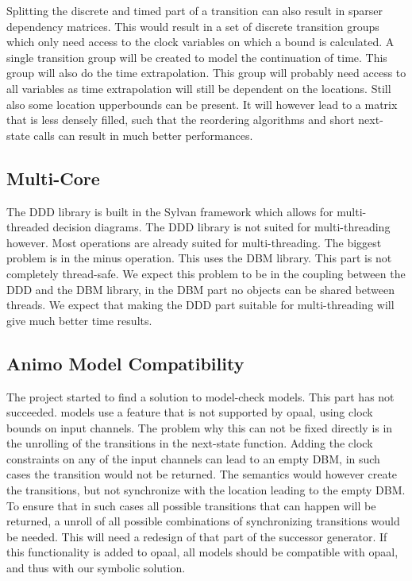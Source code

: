 Splitting the discrete and timed part of a transition can also result in sparser dependency matrices. This would result in a set of discrete transition groups which only need access to the clock variables on which a bound is calculated. A single transition group will be created to model the continuation of time. This group will also do the time extrapolation. This group will probably need access to all variables as time extrapolation will still be dependent on the locations. Still also some location upperbounds can be present. It will however lead to a matrix that is less densely filled, such that the reordering algorithms and short next-state calls can result in much better performances.

\subsection{Multi-Core}
The DDD library is built in the Sylvan framework which allows for multi-threaded decision diagrams. The DDD library is not suited for multi-threading however. Most operations are already suited for multi-threading.  The biggest problem is in the minus operation. This uses the DBM library. This part is not completely thread-safe. We expect this problem to be in the coupling between the DDD and the DBM library, in the DBM part no objects can be shared between threads. We expect that making the DDD part suitable for multi-threading will give much better time results.

\subsection{Animo Model Compatibility}
The project started to find a solution to model-check \animo{} models. This part has not succeeded. \animo{} models use a \uppaal{} feature that is not supported by opaal, using clock bounds on input channels. The problem why this can not be fixed directly is in the unrolling of the transitions in the next-state function. Adding the clock constraints on any of the input channels can lead to an empty DBM, in such cases the transition would not be returned. The semantics would however create the transitions, but not synchronize with the location leading to the empty DBM. To ensure that in such cases all possible transitions that can happen will be returned, a unroll of all possible combinations of synchronizing transitions would be needed. This will need a redesign of that part of the successor generator. If this functionality is added to opaal, all \animo{} models should be compatible with opaal, and thus with our symbolic solution.

